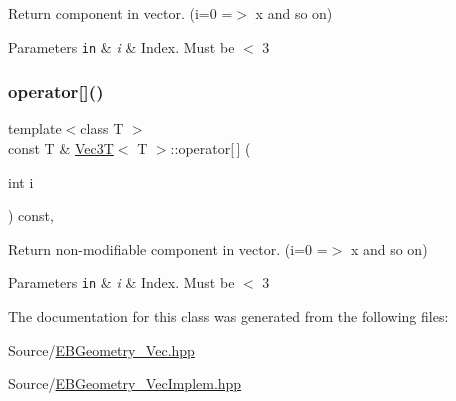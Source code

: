 Return component in vector. (i=0 =$>$ x and so on) 


\begin{DoxyParams}[1]{Parameters}
\mbox{\tt in}  & {\em i} & Index. Must be $<$ 3 \\
\hline
\end{DoxyParams}
\mbox{\label{classVec3T_ad09224c5f7e142059d75772c0cbd1990}} 
\subsubsection{\texorpdfstring{operator[]()}{operator[]()}\hspace{0.1cm}{\footnotesize\ttfamily [2/2]}}
{\footnotesize\ttfamily template$<$class T $>$ \\
const T \& \hyperlink{classVec3T}{Vec3T}$<$ T $>$\+::operator\mbox{[}$\,$\mbox{]} (\begin{DoxyParamCaption}\item[{int}]{i }\end{DoxyParamCaption}) const\hspace{0.3cm}{\ttfamily [inline]}, {\ttfamily [noexcept]}}



Return non-\/modifiable component in vector. (i=0 =$>$ x and so on) 


\begin{DoxyParams}[1]{Parameters}
\mbox{\tt in}  & {\em i} & Index. Must be $<$ 3 \\
\hline
\end{DoxyParams}


The documentation for this class was generated from the following files\+:\begin{DoxyCompactItemize}
\item 
Source/\hyperlink{EBGeometry__Vec_8hpp}{E\+B\+Geometry\+\_\+\+Vec.\+hpp}\item 
Source/\hyperlink{EBGeometry__VecImplem_8hpp}{E\+B\+Geometry\+\_\+\+Vec\+Implem.\+hpp}\end{DoxyCompactItemize}
